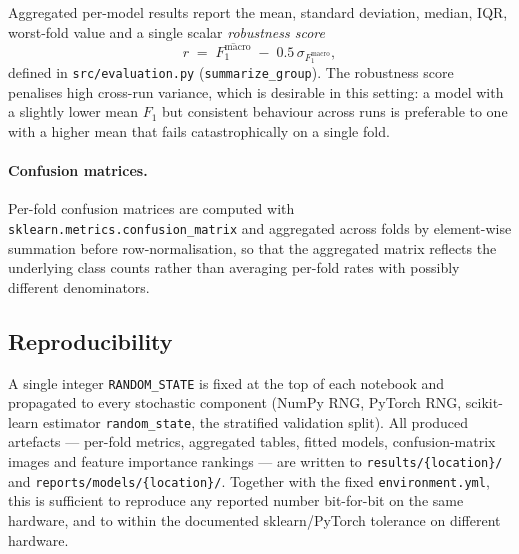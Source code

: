 Aggregated per-model results report the mean, standard deviation, median, IQR, worst-fold value and a single scalar \emph{robustness score}
\begin{equation}
    r \;=\; \overline{F_1^{\mathrm{macro}}} \;-\; 0.5\,\sigma_{F_1^{\mathrm{macro}}},
    \label{eq:robustness}
\end{equation}
defined in \texttt{src/evaluation.py} (\texttt{summarize\_group}). The robustness score penalises high cross-run variance, which is desirable in this setting: a model with a slightly lower mean $F_1$ but consistent behaviour across runs is preferable to one with a higher mean that fails catastrophically on a single fold.

\paragraph{Confusion matrices.}
Per-fold confusion matrices are computed with \texttt{sklearn.metrics.\allowbreak confusion\_matrix} and aggregated across folds by element-wise summation before row-normalisation, so that the aggregated matrix reflects the underlying class counts rather than averaging per-fold rates with possibly different denominators.

\subsection{Reproducibility}

A single integer \texttt{RANDOM\_STATE} is fixed at the top of each notebook and propagated to every stochastic component (NumPy RNG, PyTorch RNG, scikit-learn estimator \texttt{random\_state}, the stratified validation split). All produced artefacts — per-fold metrics, aggregated tables, fitted models, confusion-matrix images and feature
importance rankings — are written to \texttt{results/\{location\}/} and \texttt{reports/models/\{location\}/}. Together with the fixed \texttt{environment.yml}, this is sufficient to reproduce any reported number bit-for-bit on the same hardware, and to within the documented sklearn/PyTorch tolerance on different hardware.

